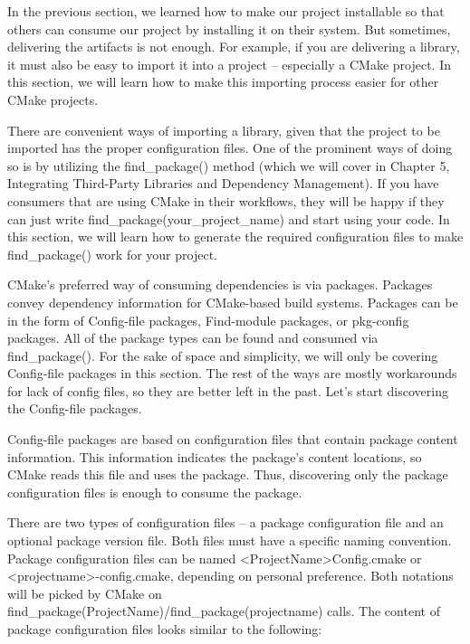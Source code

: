 
In the previous section, we learned how to make our project installable so that others can consume our project by installing it on their system. But sometimes, delivering the artifacts is not enough. For example, if you are delivering a library, it must also be easy to import it into a project – especially a CMake project. In this section, we will learn how to make this importing process easier for other CMake projects.

There are convenient ways of importing a library, given that the project to be imported has the proper configuration files. One of the prominent ways of doing so is by utilizing the find\_package() method (which we will cover in Chapter 5, Integrating Third-Party Libraries and Dependency Management). If you have consumers that are using CMake in their workflows, they will be happy if they can just write find\_package(your\_project\_name) and start using your code. In this section, we will learn how to generate the required configuration files to make find\_package() work for your project.

CMake's preferred way of consuming dependencies is via packages. Packages convey dependency information for CMake-based build systems. Packages can be in the form of Config-file packages, Find-module packages, or pkg-config packages. All of the package types can be found and consumed via find\_package(). For the sake of space and simplicity, we will only be covering Config-file packages in this section. The rest of the ways are mostly workarounds for lack of config files, so they are better left in the past. Let's start discovering the Config-file packages.


Config-file packages are based on configuration files that contain package content information. This information indicates the package's content locations, so CMake reads this file and uses the package. Thus, discovering only the package configuration files is enough to consume the package.

There are two types of configuration files – a package configuration file and an optional package version file. Both files must have a specific naming convention. Package configuration files can be named <ProjectName>Config.cmake or <projectname>-config.cmake, depending on personal preference. Both notations will be picked by CMake on find\_package(ProjectName)/find\_package(projectname) calls. The content of package configuration files looks similar to the following:

